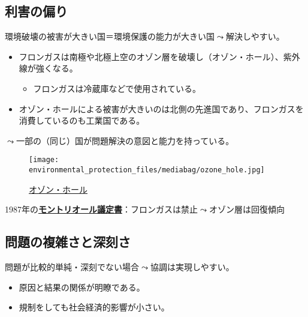 \documentclass[
  xelatex,
  ja=standard]{bxjsarticle}
\providecommand{\tightlist}{%
  \setlength{\itemsep}{0pt}\setlength{\parskip}{0pt}}\usepackage{longtable,booktabs,array}
\begin{document}
\hypertarget{ux5229ux5bb3ux306eux504fux308a}{%
\subsection{利害の偏り}\label{ux5229ux5bb3ux306eux504fux308a}}

環境破壊の被害が大きい国＝環境保護の能力が大きい国\(\leadsto\)解決しやすい。

\begin{itemize}
\tightlist
\item
  フロンガスは南極や北極上空のオゾン層を破壊し（オゾン・ホール）、紫外線が強くなる。

  \begin{itemize}
  \tightlist
  \item
    フロンガスは冷蔵庫などで使用されている。
  \end{itemize}
\item
  オゾン・ホールによる被害が大きいのは北側の先進国であり、フロンガスを消費しているのも工業国である。
\end{itemize}

\(\leadsto\)一部の（同じ）国が問題解決の意図と能力を持っている。

\begin{figure}[htpb]

{\centering \texttt{[image: environmental\_protection\_files/mediabag/ozone\_hole.jpg]}

}

\caption{\href{https://ozonewatch.gsfc.nasa.gov/facts/hole_SH.html}{オゾン・ホール}}

\end{figure}

1987年の\href{https://www.mofa.go.jp/mofaj/gaiko/kankyo/jyoyaku/ozone.html}{\textbf{モントリオール議定書}}：フロンガスは禁止\(\leadsto\)オゾン層は回復傾向\citep{solomon2016}

\hypertarget{ux554fux984cux306eux8907ux96d1ux3055ux3068ux6df1ux523bux3055}{%
\subsection{問題の複雑さと深刻さ}\label{ux554fux984cux306eux8907ux96d1ux3055ux3068ux6df1ux523bux3055}}

問題が比較的単純・深刻でない場合\(\leadsto\)協調は実現しやすい。

\begin{itemize}
\tightlist
\item
  原因と結果の関係が明瞭である。
\item
  規制をしても社会経済的影響が小さい。
\end{itemize}
\end{document}
